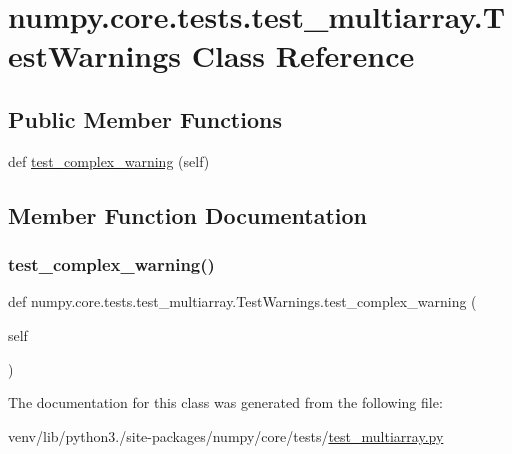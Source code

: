 \hypertarget{classnumpy_1_1core_1_1tests_1_1test__multiarray_1_1TestWarnings}{}\section{numpy.\+core.\+tests.\+test\+\_\+multiarray.\+Test\+Warnings Class Reference}
\label{classnumpy_1_1core_1_1tests_1_1test__multiarray_1_1TestWarnings}
\subsection*{Public Member Functions}
\begin{DoxyCompactItemize}
\item 
def \hyperlink{classnumpy_1_1core_1_1tests_1_1test__multiarray_1_1TestWarnings_a34674f7be409f9bd0742850660cf539b}{test\+\_\+complex\+\_\+warning} (self)
\end{DoxyCompactItemize}


\subsection{Member Function Documentation}
\mbox{\label{classnumpy_1_1core_1_1tests_1_1test__multiarray_1_1TestWarnings_a34674f7be409f9bd0742850660cf539b}} 
\subsubsection{\texorpdfstring{test\+\_\+complex\+\_\+warning()}{test\_complex\_warning()}}
{\footnotesize\ttfamily def numpy.\+core.\+tests.\+test\+\_\+multiarray.\+Test\+Warnings.\+test\+\_\+complex\+\_\+warning (\begin{DoxyParamCaption}\item[{}]{self }\end{DoxyParamCaption})}



The documentation for this class was generated from the following file\+:\begin{DoxyCompactItemize}
\item 
venv/lib/python3./site-\/packages/numpy/core/tests/\hyperlink{core_2tests_2test__multiarray_8py}{test\+\_\+multiarray.\+py}\end{DoxyCompactItemize}

